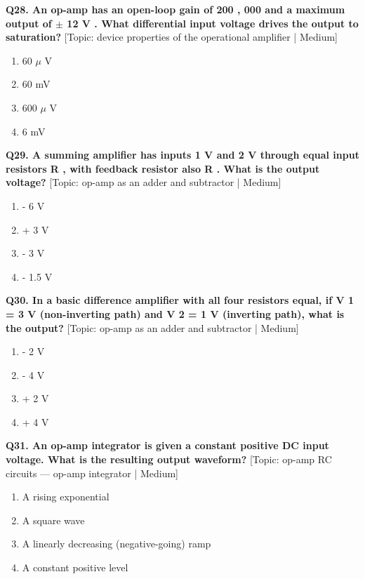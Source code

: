 \noindent\textbf{Q28. An op-amp has an open-loop gain of 200 , 000 and a maximum output of $\pm$ 12 V . What differential input voltage drives the output to saturation?} \hfill [Topic: device properties of the operational amplifier | Medium]
\begin{enumerate}[label=(\alph*),topsep=2pt,itemsep=1pt,partopsep=0pt,parsep=0pt]
    \item {60 $\mu$ V}
    \item {60 mV}
    \item {600 $\mu$ V}
    \item {6 mV}
\end{enumerate}
\vspace{2mm}

\noindent\textbf{Q29. A summing amplifier has inputs 1 V and 2 V through equal input resistors R , with feedback resistor also R . What is the output voltage?} \hfill [Topic: op-amp as an adder and subtractor | Medium]
\begin{enumerate}[label=(\alph*),topsep=2pt,itemsep=1pt,partopsep=0pt,parsep=0pt]
    \item {- 6 V}
    \item {+ 3 V}
    \item {- 3 V}
    \item {- 1.5 V}
\end{enumerate}
\vspace{2mm}

\noindent\textbf{Q30. In a basic difference amplifier with all four resistors equal, if V 1 = 3 V (non-inverting path) and V 2 = 1 V (inverting path), what is the output?} \hfill [Topic: op-amp as an adder and subtractor | Medium]
\begin{enumerate}[label=(\alph*),topsep=2pt,itemsep=1pt,partopsep=0pt,parsep=0pt]
    \item {- 2 V}
    \item {- 4 V}
    \item {+ 2 V}
    \item {+ 4 V}
\end{enumerate}
\vspace{2mm}

\noindent\textbf{Q31. An op-amp integrator is given a constant positive DC input voltage. What is the resulting output waveform?} \hfill [Topic: op-amp RC circuits --- op-amp integrator | Medium]
\begin{enumerate}[label=(\alph*),topsep=2pt,itemsep=1pt,partopsep=0pt,parsep=0pt]
    \item {A rising exponential}
    \item {A square wave}
    \item {A linearly decreasing (negative-going) ramp}
    \item {A constant positive level}
\end{enumerate}
\vspace{2mm}

